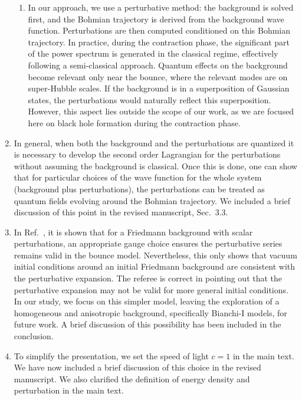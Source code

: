 \documentclass[a4paper,11pt]{article}
\begin{document}
\begin{enumerate}
\begin{enumerate}
              \item In our approach, we use a perturbative method: the background is
                    solved first, and the Bohmian trajectory is derived from the
                    background wave function. Perturbations are then computed
                    conditioned on this Bohmian trajectory. In practice, during the
                    contraction phase, the significant part of the power spectrum is
                    generated in the classical regime, effectively following a
                    semi-classical approach. Quantum effects on the background become
                    relevant only near the bounce, where the relevant modes are on
                    super-Hubble scales. If the background is in a superposition of
                    Gaussian states, the perturbations would naturally reflect this
                    superposition. However, this aspect lies outside the scope of our
                    work, as we are focused here on black hole formation during the
                    contraction phase.

          \end{enumerate}

    \item In general, when both the background and the perturbations are quantized it is necessary
          to develop the second order Lagrangian for the perturbations without assuming the background
          is classical. Once this is done, one can show that for particular choices of the wave function
          for the whole system (background plus perturbations), the perturbations can be treated as
          quantum fields evolving around the Bohmian trajectory. We included a brief discussion of this
          point in the revised manuscript, Sec.~3.3.

    \item In Ref.~\cite{vitenti2012large}, it is shown that for a Friedmann background with
          scalar perturbations, an appropriate gauge choice ensures the perturbative
          series remains valid in the bounce model. Nevertheless, this only shows that
          vacuum initial conditions around an initial Friedmann background are
          consistent with the perturbative expansion. The referee is correct in pointing
          out that the perturbative expansion may not be valid for more general initial
          conditions. In our study, we focus on this simpler model, leaving the
          exploration of a homogeneous and anisotropic background, specifically
          Bianchi-I models, for future work. A brief discussion of this possibility has
          been included in the conclusion.

    \item To simplify the presentation, we set the speed of light $c=1$ in the main
          text. We have now included a brief discussion of this choice in the revised
          manuscript. We also clarified the definition of energy density and perturbation
          in the main text.
\end{enumerate}



\end{document}
